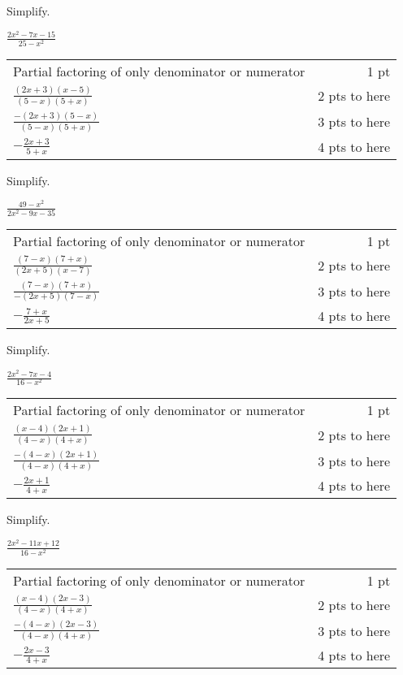 {
	Simplify.\par
	$ \displaystyle\frac{2x^2-7x-15}{25-x^2}$
}
{
	\begin{tabular}{l r}
	Partial factoring of only denominator or numerator & 1 pt\\
	$\frac{(2x+3)(x-5)}{(5-x)(5+x)}$ & 2 pts to here\\
	$\frac{-(2x+3)(5-x)}{(5-x)(5+x)}$ & 3 pts to here\\
	$-\frac{2x+3}{5+x}$ & 4 pts to here
	\end{tabular}
}

{
	Simplify.\par
	$ \displaystyle\frac{49-x^2}{2x^2-9x-35}$
}
{
	\begin{tabular}{l r}
	Partial factoring of only denominator or numerator & 1 pt\\
	$\frac{(7-x)(7+x)}{(2x+5)(x-7)}$ & 2 pts to here\\
	$\frac{(7-x)(7+x)}{-(2x+5)(7-x)}$ & 3 pts to here\\
	$-\frac{7+x}{2x+5}$ & 4 pts to here
	\end{tabular}
}

{
	Simplify.\par
	$\displaystyle\frac{2x^2-7x-4}{16-x^2}$
}
{
	\begin{tabular}{l r}
	Partial factoring of only denominator or numerator & 1 pt\\
	$\frac{(x-4)(2x+1)}{(4-x)(4+x)}$ & 2 pts to here\\
	$\frac{-(4-x)(2x+1)}{(4-x)(4+x)}$ & 3 pts to here\\
	$-\frac{2x+1}{4+x}$ & 4 pts to here
	\end{tabular}
}

{
	Simplify.\par
	$\displaystyle\frac{2x^2-11x+12}{16-x^2}$
}
{
	\begin{tabular}{l r}
	Partial factoring of only denominator or numerator & 1 pt\\
	$\frac{(x-4)(2x-3)}{(4-x)(4+x)}$ & 2 pts to here\\
	$\frac{-(4-x)(2x-3)}{(4-x)(4+x)}$ & 3 pts to here\\
	$-\frac{2x-3}{4+x}$ & 4 pts to here
	\end{tabular}
}
